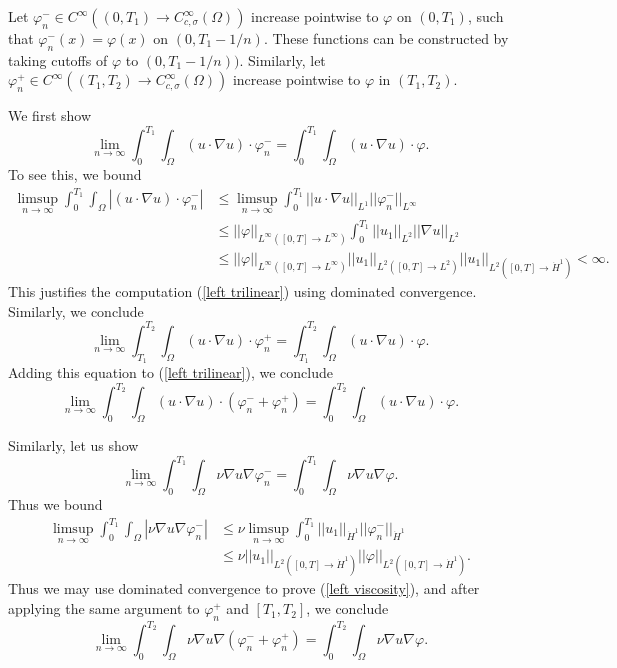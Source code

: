 \documentclass[10pt]{article}
\theoremstyle{definition}
\begin{document}
Let $\varphi_n^- \in C^\infty((0, T_1) \to C^\infty_{c, \sigma}(\Omega))$ increase pointwise to $\varphi$ on $(0, T_1)$, such that $\varphi_n^-(x) = \varphi(x)$ on $(0, T_1 - 1/n)$.
These functions can be constructed by taking cutoffs of $\varphi$ to $(0, T_1 - 1/n))$.
Similarly, let $\varphi_n^+ \in C^\infty((T_1, T_2) \to C^\infty_{c, \sigma}(\Omega))$ increase pointwise to $\varphi$ in $(T_1, T_2)$.

We first show
\begin{equation}
\label{left trilinear}
\lim_{n \to \infty} \int_0^{T_1} \int_\Omega (u \cdot \nabla u) \cdot \varphi_n^- = \int_0^{T_1} \int_\Omega (u \cdot \nabla u) \cdot \varphi.
\end{equation}
To see this, we bound
\begin{align*}
\limsup_{n \to \infty} \int_0^{T_1} \int_\Omega |(u \cdot \nabla u) \cdot \varphi_n^-| &\leq \limsup_{n \to \infty} \int_0^{T_1} ||u \cdot \nabla u||_{L^1} ||\varphi_n^-||_{L^\infty} \\
&\leq ||\varphi||_{L^\infty([0, T] \to L^\infty)} \int_0^{T_1} ||u_1||_{L^2} ||\nabla u||_{L^2}\\
&\leq ||\varphi||_{L^\infty([0, T] \to L^\infty)} ||u_1||_{L^2([0, T] \to L^2)} ||u_1||_{L^2([0, T] \to \dot H^1)} < \infty.
\end{align*}
This justifies the computation (\ref{left trilinear}) using dominated convergence.
Similarly, we conclude
$$\lim_{n \to \infty} \int_{T_1}^{T_2} \int_\Omega (u \cdot \nabla u) \cdot \varphi_n^+ = \int_{T_1}^{T_2} \int_\Omega (u \cdot \nabla u) \cdot \varphi.$$
Adding this equation to (\ref{left trilinear}), we conclude
\begin{equation}
\label{trilinear}
\lim_{n \to \infty} \int_0^{T_2} \int_\Omega (u \cdot \nabla u) \cdot (\varphi_n^- + \varphi_n^+) = \int_0^{T_2} \int_\Omega (u \cdot \nabla u) \cdot \varphi.
\end{equation}

Similarly, let us show
\begin{equation}
\label{left viscosity}
\lim_{n \to \infty} \int_0^{T_1} \int_\Omega \nu \nabla u \nabla \varphi_n^- = \int_0^{T_1} \int_\Omega \nu \nabla u \nabla \varphi.
\end{equation}
Thus we bound
\begin{align*}
\limsup_{n \to \infty} \int_0^{T_1} \int_\Omega |\nu \nabla u \nabla \varphi_n^-| &\leq \nu \limsup_{n \to \infty} \int_0^{T_1} ||u_1||_{\dot H^1} ||\varphi_n^-||_{\dot H^1}\\
&\leq \nu ||u_1||_{L^2([0, T] \to \dot H^1)} ||\varphi||_{L^2([0, T] \to \dot H^1)}.
\end{align*}
Thus we may use dominated convergence to prove (\ref{left viscosity}), and after applying the same argument to $\varphi_n^+$ and $[T_1, T_2]$, we conclude
\begin{equation}
\label{viscosity}
\lim_{n \to \infty} \int_0^{T_2} \int_\Omega \nu \nabla u \nabla (\varphi_n^- + \varphi_n^+) = \int_0^{T_2} \int_\Omega \nu \nabla u \nabla \varphi.
\end{equation}
\end{document}
